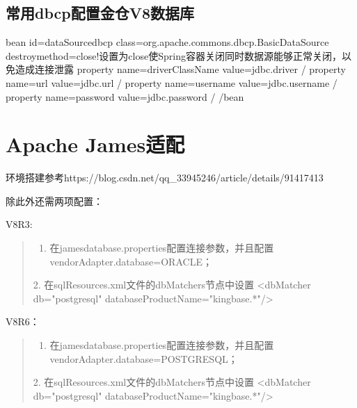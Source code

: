 \documentclass[a4,10pt,oneside,english]{sphinxmanual}
\begin{document}
\subsection{常用dbcp配置金仓V8数据库}
\label{\detokenize{interface/DBCP:dbcpv8}}
\begin{sphinxVerbatim}[commandchars=\\\{\}]
\PYGZlt{}bean id=\PYGZdq{}dataSource\PYGZus{}dbcp\PYGZdq{}
      class=\PYGZdq{}org.apache.commons.dbcp.BasicDataSource\PYGZdq{} destroy\PYGZhy{}method=\PYGZdq{}close\PYGZdq{}\PYGZgt{}\PYGZlt{}!\PYGZhy{}\PYGZhy{}设置为close使Spring容器关闭同时数据源能够正常关闭，以免造成连接泄露 \PYGZhy{}\PYGZhy{}\PYGZgt{}
      \PYGZlt{}property name=\PYGZdq{}driverClassName\PYGZdq{} value=\PYGZdq{}\PYGZdl{}\PYGZob{}jdbc.driver\PYGZcb{}\PYGZdq{} /\PYGZgt{}
      \PYGZlt{}property name=\PYGZdq{}url\PYGZdq{} value=\PYGZdq{}\PYGZdl{}\PYGZob{}jdbc.url\PYGZcb{}\PYGZdq{} /\PYGZgt{}
      \PYGZlt{}property name=\PYGZdq{}username\PYGZdq{} value=\PYGZdq{}\PYGZdl{}\PYGZob{}jdbc.username\PYGZcb{}\PYGZdq{} /\PYGZgt{}
      \PYGZlt{}property name=\PYGZdq{}password\PYGZdq{} value=\PYGZdq{}\PYGZdl{}\PYGZob{}jdbc.password\PYGZcb{}\PYGZdq{} /\PYGZgt{}
\PYGZlt{}/bean\PYGZgt{}
\end{sphinxVerbatim}


\section{Apache James适配}
\label{\detokenize{interface/apache-james:apache-james}}\label{\detokenize{interface/apache-james::doc}}
环境搭建参考https://blog.csdn.net/qq\_33945246/article/details/91417413

除此外还需两项配置：

V8R3:
\begin{quote}
\begin{enumerate}
%
\item {} 
在james\sphinxhyphen{}database.properties配置连接参数，并且配置vendorAdapter.database=ORACLE；

\end{enumerate}

2. 在sqlResources.xml文件的dbMatchers节点中设置
<dbMatcher db="postgresql" databaseProductName="kingbase.*"/>
\end{quote}

V8R6：
\begin{quote}
\begin{enumerate}
%
\item {} 
在james\sphinxhyphen{}database.properties配置连接参数，并且配置vendorAdapter.database=POSTGRESQL；

\end{enumerate}

2. 在sqlResources.xml文件的dbMatchers节点中设置
<dbMatcher db="postgresql" databaseProductName="kingbase.*"/>
\end{quote}
\end{document}
